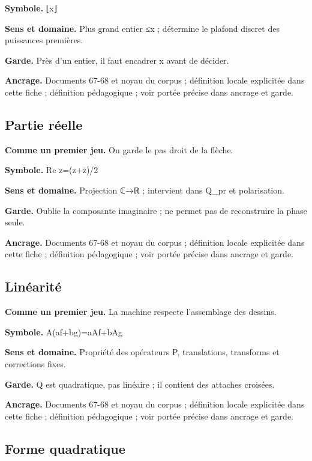 \documentclass[
  9pt,
  a4paper,
]{article}
\begin{document}
\textbf{Symbole.} ⌊x⌋

\textbf{Sens et domaine.} Plus grand entier ≤x ; détermine le plafond
discret des puissances premières.

\textbf{Garde.} Près d'un entier, il faut encadrer x avant de décider.

\textbf{Ancrage.} Documents 67-68 et noyau du corpus ; définition locale
explicitée dans cette fiche ; définition pédagogique ; voir portée
précise dans ancrage et garde.

\hypertarget{partie-ruxe9elle}{%
\subsection{Partie réelle}\label{partie-ruxe9elle}}

\textbf{Comme un premier jeu.} On garde le pas droit de la flèche.

\textbf{Symbole.} Re z=(z+z̄)/2

\textbf{Sens et domaine.} Projection ℂ→ℝ ; intervient dans Q\_pr et
polarisation.

\textbf{Garde.} Oublie la composante imaginaire ; ne permet pas de
reconstruire la phase seule.

\textbf{Ancrage.} Documents 67-68 et noyau du corpus ; définition locale
explicitée dans cette fiche ; définition pédagogique ; voir portée
précise dans ancrage et garde.

\hypertarget{linuxe9arituxe9}{%
\subsection{Linéarité}\label{linuxe9arituxe9}}

\textbf{Comme un premier jeu.} La machine respecte l'assemblage des
dessins.

\textbf{Symbole.} A(af+bg)=aAf+bAg

\textbf{Sens et domaine.} Propriété des opérateurs P, translations,
transforms et corrections fixes.

\textbf{Garde.} Q est quadratique, pas linéaire ; il contient des
attaches croisées.

\textbf{Ancrage.} Documents 67-68 et noyau du corpus ; définition locale
explicitée dans cette fiche ; définition pédagogique ; voir portée
précise dans ancrage et garde.

\hypertarget{forme-quadratique}{%
\subsection{Forme quadratique}\label{forme-quadratique}}
\end{document}
